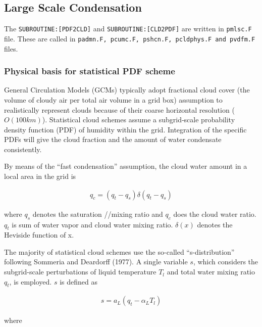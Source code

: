 \hypertarget{large-scale-condensation}{%
\subsection{Large Scale Condensation}\label{large-scale-condensation}}

The \texttt{SUBROUTINE:{[}PDF2CLD{]}} and
\texttt{SUBROUTINE:{[}CLD2PDF{]}} are written in \texttt{pmlsc.F} file.
These are called in
\texttt{padmn.F,\ pcumc.F,\ pshcn.F,\ pcldphys.F\ and\ pvdfm.F} files.

\hypertarget{physical-basis-for-statistical-pdf-scheme}{%
\subsubsection{Physical basis for statistical PDF
scheme}\label{physical-basis-for-statistical-pdf-scheme}}

General Circulation Models (GCMs) typically adopt fractional cloud cover
(the volume of cloudy air per total air volume in a grid box) assumption
to realistically represent clouds because of their coarse horizontal
resolution (\(O(100km)\)). Statistical cloud schemes assume a
subgrid‐scale probability density function (PDF) of humidity within the
grid. Integration of the specific PDFs will give the cloud fraction and
the amount of water condensate consistently.

By means of the ``fast condensation'' assumption, the cloud water amount
in a local area in the grid is

\begin{eqnarray}
q_{c}=\left(q_{t}-q_{s}\right) \delta\left(q_{t}-q_{s}\right)
\label{hpc.1}
\end{eqnarray}

where \(q_s\) denotes the saturation //mixing ratio and \(q_c\) does the
cloud water ratio. \(q_t\) is sum of water vapor and cloud water mixing
ratio. \(\delta(x)\) denotes the Heviside function of x.

The majority of statistical cloud schemes use the so-called
``s-distribution'' following Sommeria and Deardorff (1977). A single
variable \(s\), which considers the subgrid-scale perturbations of
liquid temperature \(T_l\) and total water mixing ratio \(q_t\), is
employed. \(s\) is defined as

\begin{eqnarray}
s=a_{L}\left(q_{t}-\alpha_{L} T_{l}\right)
\end{eqnarray}

where

